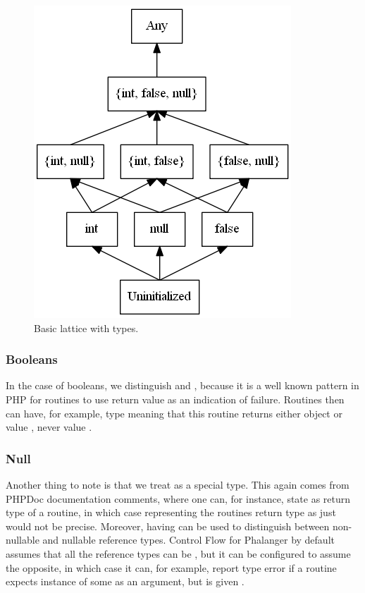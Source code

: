         \begin{figure}[h]  
          \centering        
          \includegraphics[scale=0.6]{graphs/types-lattice1.png}
          \caption{Basic lattice with types.\label{typeslattice1}}    
        \end{figure}
        
        \subsubsection*{Booleans}        
        In the case of booleans, we distinguish 
         and , because it is a well 
        known pattern in PHP for routines to use  
        return value as an indication of failure. 
        Routines then can have, for example, type 
         meaning that this routine returns either 
        object or value , never value .
        
        \subsubsection*{Null}        
        Another thing to note is that we treat  as 
        a special type. This again comes from PHPDoc documentation 
        comments, where one can, for instance, state 
         as return type of a routine, 
        in which case representing the routines return type 
        as just  would not be precise. Moreover, 
        having  can be used to distinguish between 
        non-nullable and nullable reference types. 
        Control Flow for Phalanger by default assumes that all 
        the reference types can be , but it can 
        be configured to assume the opposite, in which case it can, 
        for example, report type error if a routine expects 
        instance of some  as an argument, 
        but is given .
        
